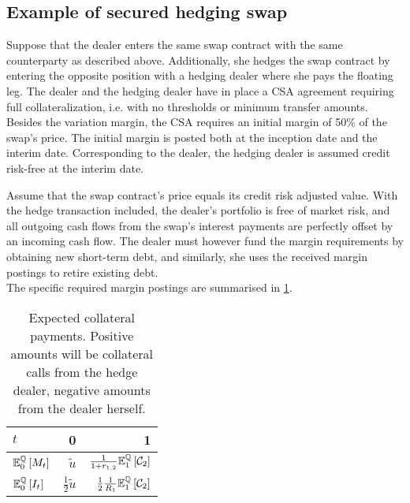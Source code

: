 \documentclass[main.tex]{subfiles}
\begin{document}
    \subsection{Example of secured hedging swap}
        Suppose that the dealer enters the same swap contract with the same counterparty as described above.
        Additionally, she hedges the swap contract by entering the opposite position with a hedging dealer
        where she pays the floating leg.
        The dealer and the hedging dealer have in place a CSA agreement 
        requiring full collateralization, i.e. with no thresholds or minimum transfer amounts.
        Besides the variation margin,
        the CSA requires an initial margin of 50\% of the swap's price.
        The initial margin is posted both at the inception date and the interim date.
        Corresponding to the dealer, the hedging dealer is assumed credit risk-free at the interim date.

        Assume that the swap contract's price equals its credit risk adjusted value.
        With the hedge transaction included,
        the dealer's portfolio is free of market risk,
        and all outgoing cash flows from the swap's interest payments
        are perfectly offset by an incoming cash flow.
        The dealer must however fund the margin requirements by obtaining new short-term debt,
        and similarly, she uses the received margin postings to retire existing debt.
        \\
        The specific required margin postings are summarised in \cref{tbl:swap-margin-postings}.

        \begin{table}[H]
            \centering
            \begin{tabular}{l|rr}
                $t$ & 0 & 1 \\
                \hline
                \rule{0pt}{1.3em}
                $\mathbb{E}_{0}^{\mathbb{Q}}\left[M_t\right]$ & $\tilde{u}$ & $\frac{1}{1+r_{1,2}}\mathbb{E}_{1}^{\mathbb{Q}}\left[\mathcal{C}_{2}\right]$ \\
                \rule{0pt}{1.3em}
                $\mathbb{E}_{0}^{\mathbb{Q}}\left[I_t\right]$ & $\frac{1}{2}\tilde{u}$ & $\frac{1}{2}\frac{1}{R_1}\mathbb{E}_{1}^{\mathbb{Q}}\left[\mathcal{C}_{2}\right]$ \\
            \end{tabular}
            \caption{
                Expected collateral payments. 
                Positive amounts will be collateral calls from the hedge dealer,
                negative amounts from the dealer herself.
            }
            \label{tbl:swap-margin-postings}
        \end{table}
\end{document}
